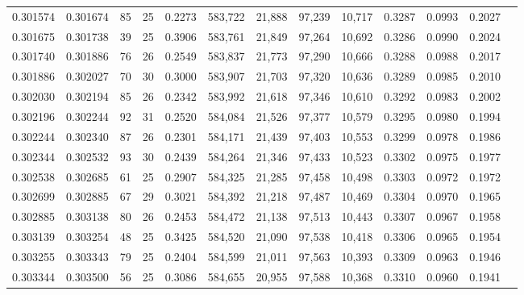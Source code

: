 \begin{tabular}{rrrrrrrrrrrrr}
0.301574 & 0.301674 &  85 &  25 &                                     0.2273 & 583,722 &  21,888 &  97,239 &  10,717 & 0.3287 & 0.0993 & 0.2027 \\
0.301675 & 0.301738 &  39 &  25 &                                     0.3906 & 583,761 &  21,849 &  97,264 &  10,692 & 0.3286 & 0.0990 & 0.2024 \\
0.301740 & 0.301886 &  76 &  26 &                                     0.2549 & 583,837 &  21,773 &  97,290 &  10,666 & 0.3288 & 0.0988 & 0.2017 \\
0.301886 & 0.302027 &  70 &  30 &                                     0.3000 & 583,907 &  21,703 &  97,320 &  10,636 & 0.3289 & 0.0985 & 0.2010 \\
0.302030 & 0.302194 &  85 &  26 &                                     0.2342 & 583,992 &  21,618 &  97,346 &  10,610 & 0.3292 & 0.0983 & 0.2002 \\
0.302196 & 0.302244 &  92 &  31 &                                     0.2520 & 584,084 &  21,526 &  97,377 &  10,579 & 0.3295 & 0.0980 & 0.1994 \\
0.302244 & 0.302340 &  87 &  26 &                                     0.2301 & 584,171 &  21,439 &  97,403 &  10,553 & 0.3299 & 0.0978 & 0.1986 \\
0.302344 & 0.302532 &  93 &  30 &                                     0.2439 & 584,264 &  21,346 &  97,433 &  10,523 & 0.3302 & 0.0975 & 0.1977 \\
0.302538 & 0.302685 &  61 &  25 &                                     0.2907 & 584,325 &  21,285 &  97,458 &  10,498 & 0.3303 & 0.0972 & 0.1972 \\
0.302699 & 0.302885 &  67 &  29 &                                     0.3021 & 584,392 &  21,218 &  97,487 &  10,469 & 0.3304 & 0.0970 & 0.1965 \\
0.302885 & 0.303138 &  80 &  26 &                                     0.2453 & 584,472 &  21,138 &  97,513 &  10,443 & 0.3307 & 0.0967 & 0.1958 \\
0.303139 & 0.303254 &  48 &  25 &                                     0.3425 & 584,520 &  21,090 &  97,538 &  10,418 & 0.3306 & 0.0965 & 0.1954 \\
0.303255 & 0.303343 &  79 &  25 &                                     0.2404 & 584,599 &  21,011 &  97,563 &  10,393 & 0.3309 & 0.0963 & 0.1946 \\
0.303344 & 0.303500 &  56 &  25 &                                     0.3086 & 584,655 &  20,955 &  97,588 &  10,368 & 0.3310 & 0.0960 & 0.1941 \\

\end{tabular}
